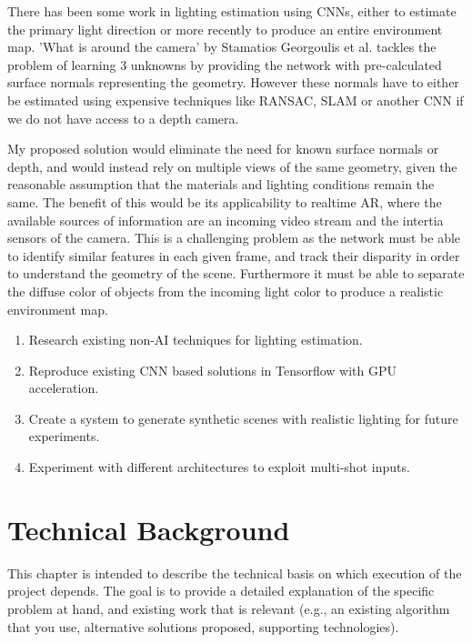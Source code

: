 \documentclass[ %
                    author={Gavin Parker},
                supervisor={Dr. Neill Campbell},
                    degree={MEng},
                     title={Deep Siamese Networks for Illumination Estimation from Stereo Images},
                  subtitle={},
                      type={research},
                      year={2018} ]{dissertation}
\begin{document}
There has been some work in lighting estimation using CNNs, either to estimate the primary light direction or more recently to produce an entire environment map. 'What is around the camera' by Stamatios Georgoulis et al. tackles the problem of learning 3 unknowns by providing the network with pre-calculated surface normals representing the geometry. However these normals have to either be estimated using expensive techniques like RANSAC, SLAM or another CNN if we do not have access to a depth camera.

My proposed solution would eliminate the need for known surface normals or depth, and would instead rely on multiple views of the same geometry, given the reasonable assumption that the materials and lighting conditions remain the same. The benefit of this would be its applicability to realtime AR, where the available sources of information are an incoming video stream and the intertia sensors of the camera. This is a challenging problem as the network must be able to identify similar features in each given frame, and track their disparity in order to understand the geometry of the scene. Furthermore it must be able to separate the diffuse color of objects from the incoming light color to produce a realistic environment map.
 

\begin{enumerate}
\item Research existing non-AI techniques for lighting estimation.
\item Reproduce existing CNN based solutions in Tensorflow with GPU acceleration.
\item Create a system to generate synthetic scenes with realistic lighting for future experiments.
\item Experiment with different architectures to exploit multi-shot inputs.
\end{enumerate}


\chapter{Technical Background}
\label{chap:technical}

\vspace{1cm} 

\noindent
This chapter is intended to describe the technical basis on which execution
of the project depends.  The goal is to provide a detailed explanation of
the specific problem at hand, and existing work that is relevant (e.g., an
existing algorithm that you use, alternative solutions proposed, supporting
technologies).  
\end{document}
